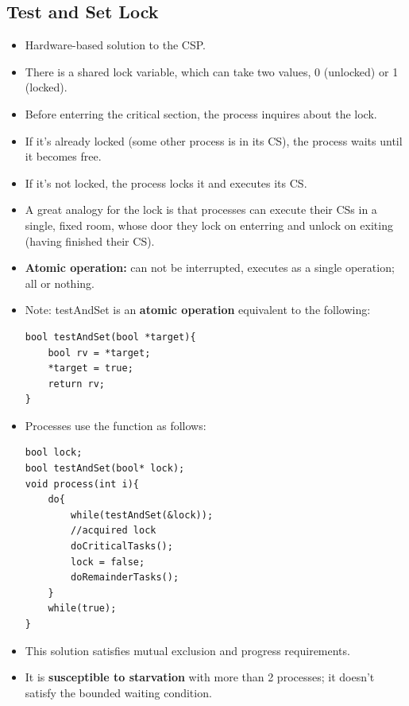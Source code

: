 \documentclass[10pt]{report}
\begin{document}
\subsection{Test and Set Lock}
\begin{itemize}
\item Hardware-based solution to the CSP.
\item There is a shared lock variable, which can take two values, 0 (unlocked) or 1 (locked).
\item Before enterring the critical section, the process inquires about the lock.
\item If it's already locked (some other process is in its CS), the process waits until it becomes free.
\item If it's not locked, the process locks it and executes its CS.
\item A great analogy for the lock is that processes can execute their CSs in a single, fixed room, whose door they lock on enterring and unlock on exiting (having finished their CS).
\item \textbf{Atomic operation:} can not be interrupted, executes as a single operation; all or nothing.
\item Note: testAndSet is an \textbf{atomic operation} equivalent to the following:
\begin{lstlisting}
bool testAndSet(bool *target){
    bool rv = *target;
    *target = true;
    return rv;
}
\end{lstlisting}
\item Processes use the function as follows:
\begin{lstlisting}
bool lock;
bool testAndSet(bool* lock);
void process(int i){
    do{
        while(testAndSet(&lock));
        //acquired lock
        doCriticalTasks();
        lock = false;
        doRemainderTasks();
    }
    while(true);
}
\end{lstlisting}
\item This solution satisfies mutual exclusion and progress requirements.
\item It is \textbf{susceptible to starvation} with more than 2 processes; it doesn't satisfy the bounded waiting condition.
\end{itemize}
\end{document}
